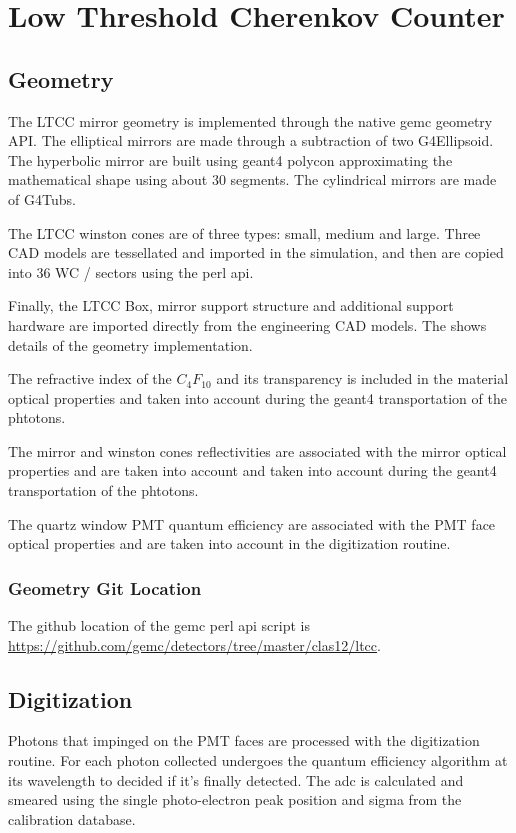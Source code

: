 \section{Low Threshold Cherenkov Counter}


\subsection{Geometry}
The LTCC mirror geometry is implemented through the native gemc geometry API. The elliptical mirrors are made through a subtraction of
two G4Ellipsoid. The hyperbolic mirror are built using geant4 polycon approximating the mathematical shape using about 30 segments.
The cylindrical mirrors are made of G4Tubs.

The LTCC winston cones are of three types: small, medium and large. Three CAD models are tessellated and imported in the simulation, and
then are copied into 36 WC / sectors using the perl api.

Finally, the LTCC Box, mirror support structure and additional support hardware are imported directly from the engineering CAD models.
The  shows details of the geometry implementation.

The refractive index of the $C_4F_10$ and its transparency is included in the material optical properties and taken
into account during the geant4 transportation of the phtotons.

The mirror and winston cones reflectivities are associated with the mirror optical properties and are taken into
account and taken into account during the geant4 transportation of the phtotons.

The quartz window PMT quantum efficiency are associated with the PMT face optical properties and are taken into account in
the digitization routine.

\subsubsection{Geometry Git Location}
The github location of the gemc perl api script is \url{https://github.com/gemc/detectors/tree/master/clas12/ltcc}.


\subsection{Digitization}

Photons that impinged on the PMT faces are processed with the digitization routine.
For each photon collected undergoes the quantum efficiency algorithm at its wavelength to decided if it's finally detected.
The adc is calculated and smeared using the single photo-electron peak position and sigma from the calibration database.



